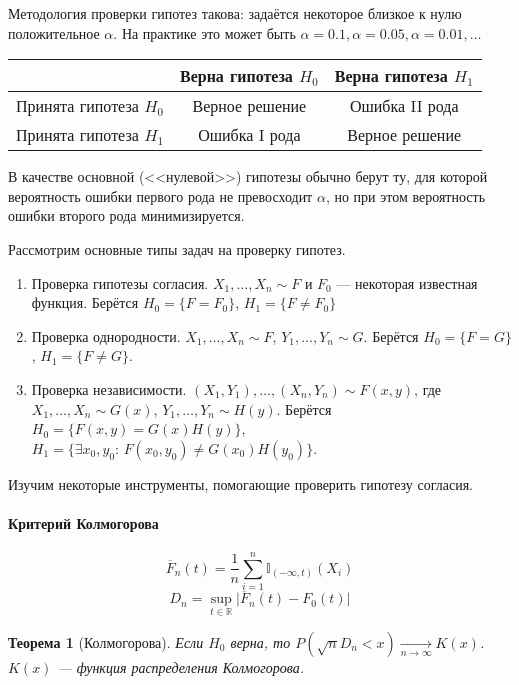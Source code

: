 \documentclass[11pt,openany,a4paper]{scrartcl}
\theoremstyle{plain}
\newtheorem{theorem}{Теорема}[subsection]
\theoremstyle{definition}
\newcommand\mb{\mathbb}
\newcommand\real{\mb R}
\newcommand{\underto}[1]{\xrightarrow[#1]{}}
\newcommand{\ol}{\overline}
\begin{document}
Методология проверки гипотез такова: задаётся некоторое близкое к нулю положительное $\alpha$. На
практике это может быть $\alpha = 0.1, \alpha = 0.05, \alpha = 0.01, \ldots$

\begin{center}
    \begin{tabular}{|c|c|c|}
        \hline
        & Верна гипотеза $H_0$ & Верна гипотеза $H_1$ \\ \hline
        Принята гипотеза $H_0$ & Верное решение & Ошибка II рода \\ \hline
        Принята гипотеза $H_1$ & Ошибка I рода & Верное решение \\ \hline
    \end{tabular}
\end{center}

В качестве основной (<<нулевой>>) гипотезы обычно берут ту, для которой вероятность ошибки
первого рода не превосходит $\alpha$, но при этом вероятность ошибки второго рода минимизируется.

Рассмотрим основные типы задач на проверку гипотез.
\begin{enumerate}
    \item Проверка гипотезы согласия. $X_1, \ldots, X_n \sim F$ и $F_0$ — некоторая известная 
    функция. Берётся $H_0 = \{F = F_0\}$, $H_1 = \{F \neq F_0\}$
    \item Проверка однородности. $X_1, \ldots, X_n \sim F$, $Y_1, \ldots, Y_n \sim G$. Берётся
    $H_0 = \{F = G\}$, $H_1 = \{F \neq G\}$.
    \item Проверка независимости. $(X_1, Y_1), \ldots, (X_n, Y_n) \sim F(x, y)$, где
    $X_1, \ldots, X_n \sim G(x)$, $Y_1, \ldots, Y_n \sim H(y)$. Берётся
    $H_0 = \{F(x, y) = G(x)H(y)\}$, $H_1 = \{\exists x_0, y_0:\, F(x_0, y_0) \neq G(x_0)H(y_0)\}$.
\end{enumerate}

Изучим некоторые инструменты, помогающие проверить гипотезу согласия.

\paragraph{Критерий Колмогорова}
$$
\ol F_n(t) = \frac{1}{n}\sum\limits_{i=1}^n \mb I_{(-\infty, t)}(X_i)
$$
$$
D_n = \sup\limits_{t \in \real} \Big| \ol F_n(t) - F_0(t) \Big|
$$

\begin{theorem}[Колмогорова]
    Если $H_0$ верна, то $P(\sqrt n D_n < x) \underto{n \to \infty} K(x)$. $K(x)$ — функция
    распределения Колмогорова.
\end{theorem}
\end{document}
